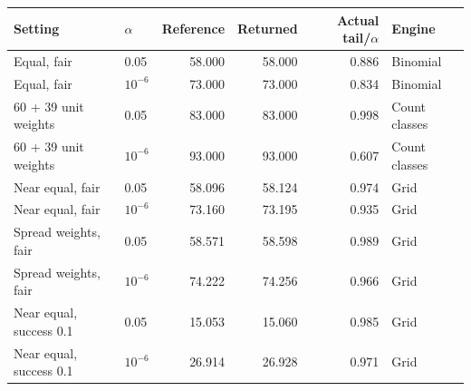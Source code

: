 \begin{tabular}{llrrrl}
\toprule
Setting & $\alpha$ & Reference & Returned & Actual tail/$\alpha$ & Engine \\
\midrule
Equal, fair & 0.05 & 58.000 & 58.000 & 0.886 & Binomial \\
Equal, fair & $10^{-6}$ & 73.000 & 73.000 & 0.834 & Binomial \\
60 + 39 unit weights & 0.05 & 83.000 & 83.000 & 0.998 & Count classes \\
60 + 39 unit weights & $10^{-6}$ & 93.000 & 93.000 & 0.607 & Count classes \\
Near equal, fair & 0.05 & 58.096 & 58.124 & 0.974 & Grid \\
Near equal, fair & $10^{-6}$ & 73.160 & 73.195 & 0.935 & Grid \\
Spread weights, fair & 0.05 & 58.571 & 58.598 & 0.989 & Grid \\
Spread weights, fair & $10^{-6}$ & 74.222 & 74.256 & 0.966 & Grid \\
Near equal, success 0.1 & 0.05 & 15.053 & 15.060 & 0.985 & Grid \\
Near equal, success 0.1 & $10^{-6}$ & 26.914 & 26.928 & 0.971 & Grid \\
\bottomrule
\end{tabular}
